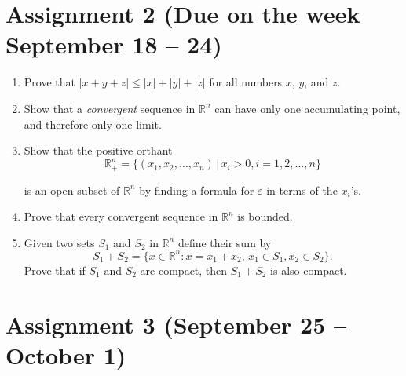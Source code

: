 \documentclass[12pt]{article} %
\theoremstyle{definition} %
\newcommand{\R}{\mathbb{R}}
\begin{document}
\section*{Assignment 2 (Due on the week September 18 – 24)}
\begin{enumerate}

\item Prove that $|x+y+z|\leq |x|+|y|+|z|$ for all numbers $x$, $y$, and $z$.

\item Show that a \textit{convergent} sequence in $\R^n$ can have only one accumulating point, and therefore only one limit.

\item Show that the positive orthant
\[
	\R^n_+=\{(x_1, x_2,\dots, x_n)\,|\, x_i>0, i=1,2,\dots, n\}
\]

is an open subset of $\R^n$ by finding a formula for $\varepsilon$ in terms of the $x_i$'s.

\item Prove that every convergent sequence in $\R^n$ is bounded.

\item Given two sets $S_1$ and $S_2$ in $\R^n$ define their sum by 
\[
	S_1+S_2=\{x\in \R^n\colon x=x_1+x_2,\, x_1\in S_1, x_2\in S_2\}.
\]
Prove that if $S_1$ and $S_2$ are compact, then $S_1+S_2$ is also compact.

\end{enumerate}



\section*{Assignment 3 (September 25 – October 1)}
\end{document}
